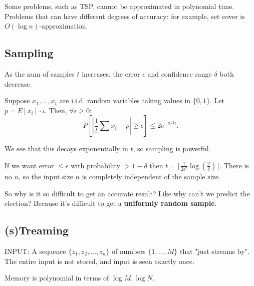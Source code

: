 \documentclass{article}
\begin{document}
    Some problems, such as TSP, cannot be approximated in polynomial time. Problems that can have different degrees of accuracy: for example, set cover is $O(\log n)$-approximation.

    \subsection{Sampling}
    As the num of samples $t$ increases, the error $\epsilon$ and confidence range $\delta$ both decrease. 

    \begin{thm}
    Suppose $x_1, \ldots, x_t$ are i.i.d. random variables taking values in $\{0, 1\}$. Let $p = E[x_i] \cdot i$. Then, $\forall \epsilon \geq 0$:
    \[ P[\left|\frac{1}{t} \sum{}{}x_i - p\right| \geq \epsilon] \leq 2e^{-2\epsilon^2 t}.\]
    \end{thm}

    We see that this decays exponentially in $t$, so sampling is powerful.

    If we want error $\leq \epsilon$ with probability $> 1 - \delta$ then $t = \lceil\frac{1}{2\epsilon^2} \log \left(\frac{2}{\delta}\right) \rceil$. There is no $n$, so the input size $n$ is completely independent of the sample size. 

    So why is it so difficult to get an accurate result? Like why can't we predict the election? Because it's difficult to get a \textbf{uniformly random sample}. 

    \subsection{(s)Treaming}
    INPUT: A sequence $\{z_1, z_2, \ldots, z_n\}$ of numbers $\{1, \ldots, M\}$ that "just streams by". The entire input is not stored, and input is seen exactly once.

    Memory is polynomial in terms of $\log M, \log N$.
\end{document}
